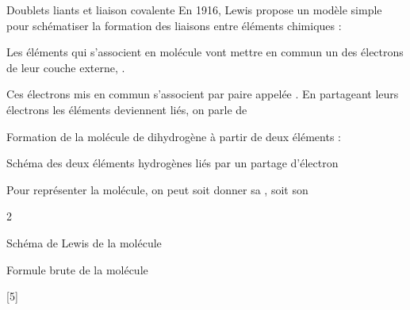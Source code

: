 \begin{doc}{Doublets liants et liaison covalente}
  En 1916, Lewis propose un modèle simple pour schématiser la formation des liaisons entre éléments chimiques :
  \begin{importants}  
    Les éléments qui s'associent en molécule vont mettre en commun un des électrons de leur couche externe, .
  \end{importants}
  \begin{importants}
    Ces électrons mis en commun s'associent par paire appelée .
    En partageant leurs électrons les éléments deviennent liés, on parle de 
  \end{importants}
  
  \exemple Formation de la molécule de dihydrogène  à partir de deux éléments  :
  
  \begin{center}
    {\small Schéma des deux éléments hydrogènes liés par un partage d'électron}
    \vspace{8pt}
    
  \end{center}

  Pour représenter la molécule, on peut soit donner sa , soit son 
  \begin{multicols}{2}
    \begin{center}
      Schéma de Lewis de la molécule \\[4pt]

      {\Huge {}}
    \end{center}

    \begin{center}
      Formule brute de la molécule \\[4pt]

      {\Huge {}}
    \end{center}
  \end{multicols}
\end{doc}

\newpage
{}[5]

